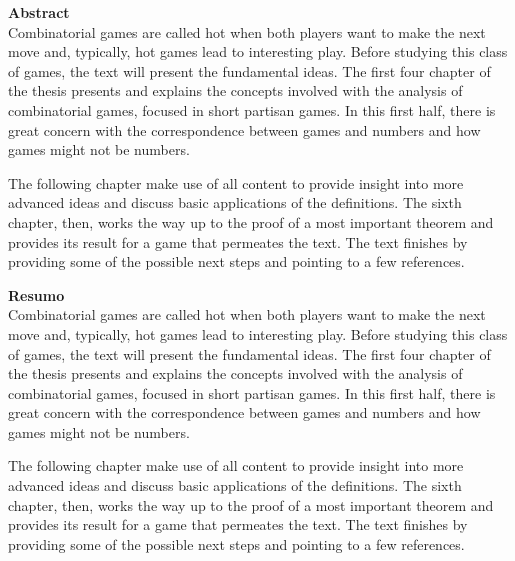\newpage

{
\noindent\Large\textbf{Abstract}
}\\


\noindent
Combinatorial games are called hot when both players want to make the next move and, typically, hot games lead to interesting play. Before studying this class of games, the text will present the fundamental ideas. The first four chapter of the thesis presents and explains the concepts involved with the analysis of combinatorial games, focused in short partisan games. In this first half, there is great concern with the correspondence between games and numbers and how games might not be numbers.

The following chapter make use of all content to provide insight into more advanced ideas and discuss basic applications of the definitions. The sixth chapter, then, works the way up to the proof of a most important theorem and provides its result for a game that permeates the text. The text finishes by providing some of the possible next steps and pointing to a few references.

\newpage

{
\noindent\Large\textbf{Resumo}
}\\


\noindent
Combinatorial games are called hot when both players want to make the next move and, typically, hot games lead to interesting play. Before studying this class of games, the text will present the fundamental ideas. The first four chapter of the thesis presents and explains the concepts involved with the analysis of combinatorial games, focused in short partisan games. In this first half, there is great concern with the correspondence between games and numbers and how games might not be numbers.

The following chapter make use of all content to provide insight into more advanced ideas and discuss basic applications of the definitions. The sixth chapter, then, works the way up to the proof of a most important theorem and provides its result for a game that permeates the text. The text finishes by providing some of the possible next steps and pointing to a few references.